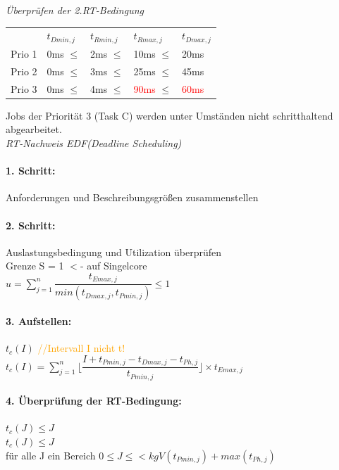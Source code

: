 \documentclass[12pt,a4paper,oneside,ngerman]{article}
\begin{document}
\emph{Überprüfen der 2.RT-Bedingung}\\

\begin{table}[H]
	\begin{tabular}{lllll}
		   & \( t_{Dmin,j}\) & \(t_{Rmin,j}\) & \(t_{Rmax,j}\) & \(t_{Dmax,j}\) \\
	Prio 1 & 0ms $\leq$		 & 2ms $\leq$     & 10ms $\leq$    & 20ms          \\
	Prio 2 & 0ms $\leq$      & 3ms $\leq$     & 25ms $\leq$    & 45ms          \\
	Prio 3 & 0ms $\leq$      & 4ms $\leq$     & \textcolor{red}{90ms} $\leq$    & \textcolor{red}{60ms} \\
	\end{tabular}
\end{table}

Jobs der Priorität 3 (Task C) werden unter Umständen nicht schritthaltend abgearbeitet.\\

\emph{RT-Nachweis EDF(Deadline Scheduling)}\\
\paragraph{1. Schritt:} Anforderungen und Beschreibungsgrößen zusammenstellen\\
\paragraph{2. Schritt:} Auslastungsbedingung und Utilization überprüfen\\
Grenze S = 1 $<$- auf Singelcore\\
\(u = \displaystyle\sum_{j=1}^n \dfrac{t_{Emax,j}}{ min(t_{Dmax,j}, t_{Pmin,j})} \leq 1\) \\
\paragraph{3. Aufstellen:} \(t_c(I)\) \textcolor{orange}{//Intervall I nicht t!} \\

\( t_c(I) = \displaystyle\sum_{j=1}^n \Big\lfloor \dfrac{I + t_{Pmin,j} - t_{Dmax,j} - t_{Ph,j} }{ t_{Pmin,j} } \Big\rfloor \times t_{Emax,j} \) \\

\paragraph{4. Überprüfung der RT-Bedingung:} \(t_{c}(J) \leq J\) \\
\(t_{c}(J) \leq J\)\\
für alle J ein Bereich
\(0 \leq J \leq < kgV(t_{Pmin,j}) + max(t_{Ph,j}) \)
\end{document}
